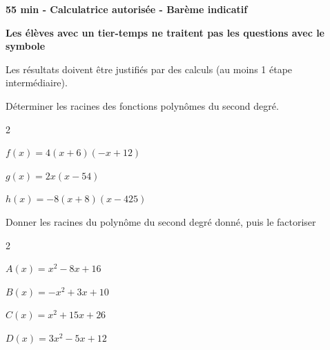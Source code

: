 \documentclass[12pt,a4paper]{article}  %
\begin{document}
\begin{center}

\end{center}




\begin{center}\textbf{55 min - Calculatrice autorisée - Barème indicatif}\end{center}

\begin{center}\textbf{Les élèves avec un tier-temps ne traitent pas les questions avec  le symbole }\end{center}

\begin{center}
Les résultats doivent être justifiés par des calculs (au moins 1 étape intermédiaire).
\end{center}
\vspace{.05cm} 


Déterminer les racines des fonctions polynômes du second degré.
\begin{multicols}{2}
\begin{enumMet}
    \item {} $f(x)=4(x+6)(-x+12)$
    \item $g(x)=2x(x-54)$
    \item $h(x)=-8(x+8)(x-425)$
\end{enumMet}
\end{multicols}

\vspace{-0.3cm}

Donner les racines du polynôme du second degré donné, puis le factoriser
\begin{multicols}{2}
\begin{enumMet}
    \item {} $A(x)=x^{2}-8 x+16$
    \item $B(x)=-x^{2}+3 x+10$
    \item $C(x)=x^{2}+15x+26$
    \item $D(x)=3 x^{2}-5 x+12$
\end{enumMet}
\end{multicols}
\end{document}
